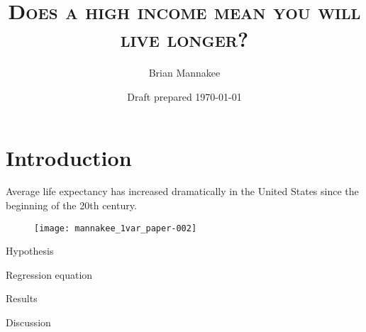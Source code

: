 \documentclass[12pt]{article}
\title{\textsc{Does a high income mean you will live longer?}}
\author{Brian Mannakee}
\date{Draft prepared \today} %
\begin{document}

\maketitle

\newpage
\section*{Introduction}
Average life expectancy has increased dramatically in the United States since the beginning of the 20th century.
\begin{figure}[h]
\begin{center}
\texttt{[image: mannakee\_1var\_paper-002]}
\end{center}
\end{figure}

Hypothesis

Regression equation

Results

Discussion
\end{document}
